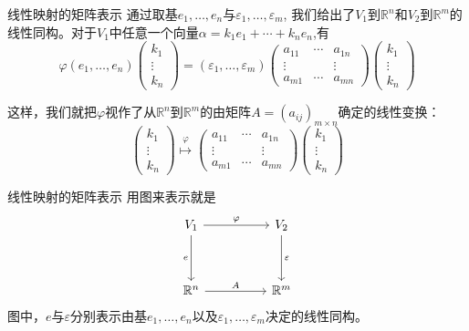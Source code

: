 
\begin{frame}

\begin{block}{线性映射的矩阵表示}
通过取基$e_1, \ldots, e_n$与$\varepsilon_1, \ldots, \varepsilon_m$, 我们给出了$V_1$到$\mathbb{R}^n$和$V_2$到$\mathbb{R}^m$的线性同构。对于$V_1$中任意一个向量$\alpha = k_1e_1 + \cdots + k_ne_n$,有
$$\varphi(e_1, \ldots, e_n) \begin{pmatrix} k_1 \\ \vdots \\ k_n \end{pmatrix} = (\varepsilon_1, \ldots, \varepsilon_m) \begin{pmatrix}
a_{11} & \cdots & a_{1n} \\ \vdots & & \vdots \\ a_{m1} & \cdots & a_{mn} \end{pmatrix} \begin{pmatrix} k_1 \\ \vdots \\ k_n \end{pmatrix}$$

\pause

这样，我们就把$\varphi$视作了从$\mathbb{R}^n$到$\mathbb{R}^m$的由矩阵$A = (a_{ij})_{m\times n}$确定的线性变换：
$$\begin{pmatrix} k_1 \\ \vdots \\ k_n \end{pmatrix} \overset{\varphi}{\mapsto} \begin{pmatrix}
a_{11} & \cdots & a_{1n} \\ \vdots & & \vdots \\ a_{m1} & \cdots & a_{mn} \end{pmatrix} \begin{pmatrix} k_1 \\ \vdots \\ k_n \end{pmatrix}$$
\end{block}

\end{frame}


\begin{frame}[fragile]

\begin{block}{线性映射的矩阵表示}
用图来表示就是
\[
\begin{tikzcd}[column sep = huge, row sep = huge]
V_1 \ar[r, "\varphi"] \ar[d, "e"'] & V_2 \ar[d, "\varepsilon"] \\
\mathbb{R}^n \ar[r, "A"] & \mathbb{R}^m
\end{tikzcd}
\]
图中，$e$与$\varepsilon$分别表示由基$e_1, \ldots, e_n$以及$\varepsilon_1, \ldots, \varepsilon_m$决定的线性同构。
\end{block}

\end{frame}

